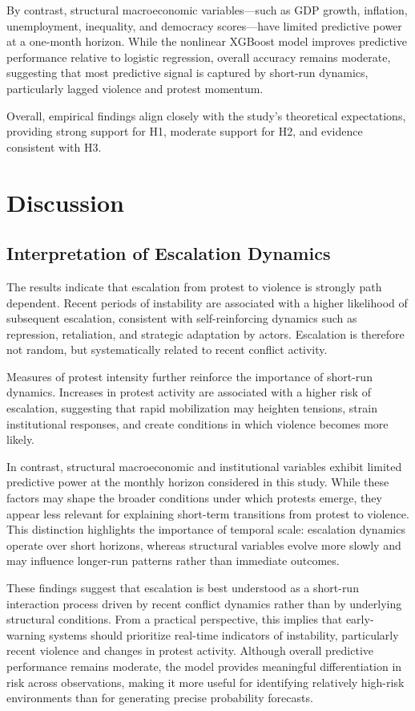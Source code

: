 \documentclass[12pt]{article}
\begin{document}
By contrast, structural macroeconomic variables—such as GDP growth, inflation, unemployment, inequality, and democracy scores—have limited predictive power at a one-month horizon. While the nonlinear XGBoost model improves predictive performance relative to logistic regression, overall accuracy remains moderate, suggesting that most predictive signal is captured by short-run dynamics, particularly lagged violence and protest momentum.

Overall, empirical findings align closely with the study’s theoretical expectations, providing strong support for H1, moderate support for H2, and evidence consistent with H3.

\section{Discussion}
\label{sec:disc}

\subsection{Interpretation of Escalation Dynamics}

The results indicate that escalation from protest to violence is strongly path dependent. Recent periods of instability are associated with a higher likelihood of subsequent escalation, consistent with self-reinforcing dynamics such as repression, retaliation, and strategic adaptation by actors. Escalation is therefore not random, but systematically related to recent conflict activity.

Measures of protest intensity further reinforce the importance of short-run dynamics. Increases in protest activity are associated with a higher risk of escalation, suggesting that rapid mobilization may heighten tensions, strain institutional responses, and create conditions in which violence becomes more likely.

In contrast, structural macroeconomic and institutional variables exhibit limited predictive power at the monthly horizon considered in this study. While these factors may shape the broader conditions under which protests emerge, they appear less relevant for explaining short-term transitions from protest to violence. This distinction highlights the importance of temporal scale: escalation dynamics operate over short horizons, whereas structural variables evolve more slowly and may influence longer-run patterns rather than immediate outcomes.

These findings suggest that escalation is best understood as a short-run interaction process driven by recent conflict dynamics rather than by underlying structural conditions. From a practical perspective, this implies that early-warning systems should prioritize real-time indicators of instability, particularly recent violence and changes in protest activity. Although overall predictive performance remains moderate, the model provides meaningful differentiation in risk across observations, making it more useful for identifying relatively high-risk environments than for generating precise probability forecasts. 
\end{document}
